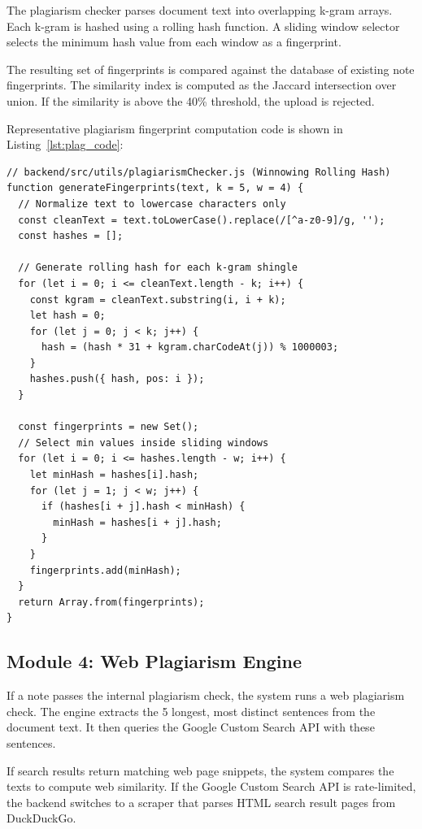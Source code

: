 \documentclass[12,Times new Roman,a4paper]{report}
\begin{document}
The plagiarism checker parses document text into overlapping k-gram arrays. Each k-gram is hashed using a rolling hash function. A sliding window selector selects the minimum hash value from each window as a fingerprint. 

The resulting set of fingerprints is compared against the database of existing note fingerprints. The similarity index is computed as the Jaccard intersection over union. If the similarity is above the 40\% threshold, the upload is rejected.

Representative plagiarism fingerprint computation code is shown in Listing~\ref{lst:plag_code}:

\begin{verbatim}
// backend/src/utils/plagiarismChecker.js (Winnowing Rolling Hash)
function generateFingerprints(text, k = 5, w = 4) {
  // Normalize text to lowercase characters only
  const cleanText = text.toLowerCase().replace(/[^a-z0-9]/g, '');
  const hashes = [];

  // Generate rolling hash for each k-gram shingle
  for (let i = 0; i <= cleanText.length - k; i++) {
    const kgram = cleanText.substring(i, i + k);
    let hash = 0;
    for (let j = 0; j < k; j++) {
      hash = (hash * 31 + kgram.charCodeAt(j)) % 1000003;
    }
    hashes.push({ hash, pos: i });
  }

  const fingerprints = new Set();
  // Select min values inside sliding windows
  for (let i = 0; i <= hashes.length - w; i++) {
    let minHash = hashes[i].hash;
    for (let j = 1; j < w; j++) {
      if (hashes[i + j].hash < minHash) {
        minHash = hashes[i + j].hash;
      }
    }
    fingerprints.add(minHash);
  }
  return Array.from(fingerprints);
}
\end{verbatim}
\label{lst:plag_code}

\subsection{Module 4: Web Plagiarism Engine}

If a note passes the internal plagiarism check, the system runs a web plagiarism check. The engine extracts the 5 longest, most distinct sentences from the document text. It then queries the Google Custom Search API with these sentences. 

If search results return matching web page snippets, the system compares the texts to compute web similarity. If the Google Custom Search API is rate-limited, the backend switches to a scraper that parses HTML search result pages from DuckDuckGo.
\end{document}
